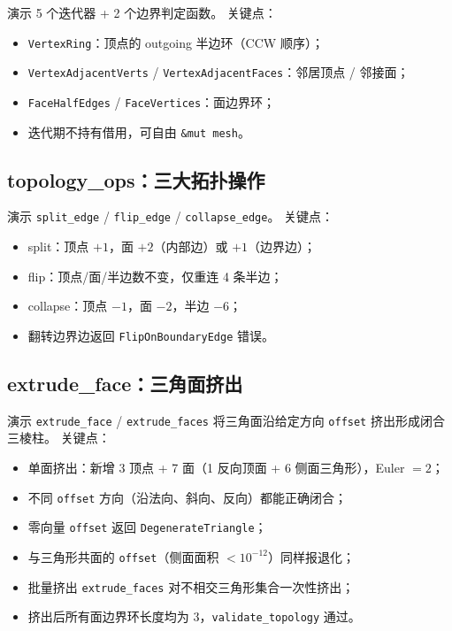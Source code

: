 \documentclass[11pt,a4paper]{article}
\begin{document}
演示 5 个迭代器 + 2 个边界判定函数。
关键点：
\begin{itemize}
  \item \texttt{VertexRing}：顶点的 outgoing 半边环（CCW 顺序）；
  \item \texttt{VertexAdjacentVerts} / \texttt{VertexAdjacentFaces}：邻居顶点 / 邻接面；
  \item \texttt{FaceHalfEdges} / \texttt{FaceVertices}：面边界环；
  \item 迭代期不持有借用，可自由 \texttt{\&mut mesh}。
\end{itemize}

\subsection{topology\_ops：三大拓扑操作}

演示 \texttt{split\_edge} / \texttt{flip\_edge} / \texttt{collapse\_edge}。
关键点：
\begin{itemize}
  \item split：顶点 $+1$，面 $+2$（内部边）或 $+1$（边界边）；
  \item flip：顶点/面/半边数不变，仅重连 4 条半边；
  \item collapse：顶点 $-1$，面 $-2$，半边 $-6$；
  \item 翻转边界边返回 \texttt{FlipOnBoundaryEdge} 错误。
\end{itemize}

\subsection{extrude\_face：三角面挤出}

演示 \texttt{extrude\_face} / \texttt{extrude\_faces} 将三角面沿给定方向
\texttt{offset} 挤出形成闭合三棱柱。
关键点：
\begin{itemize}
  \item 单面挤出：新增 3 顶点 + 7 面（1 反向顶面 + 6 侧面三角形），Euler $=2$；
  \item 不同 \texttt{offset} 方向（沿法向、斜向、反向）都能正确闭合；
  \item 零向量 \texttt{offset} 返回 \texttt{DegenerateTriangle}；
  \item 与三角形共面的 \texttt{offset}（侧面面积 $< 10^{-12}$）同样报退化；
  \item 批量挤出 \texttt{extrude\_faces} 对不相交三角形集合一次性挤出；
  \item 挤出后所有面边界环长度均为 3，\texttt{validate\_topology} 通过。
\end{itemize}
\end{document}
